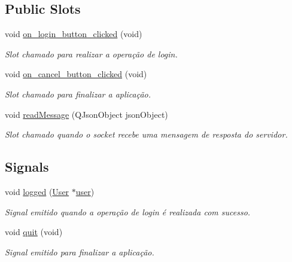 \subsection*{Public Slots}
\begin{DoxyCompactItemize}
\item 
void \hyperlink{classMyLoginDialog_ab850edc55bc360a5271f8da572d9b84b}{on\+\_\+login\+\_\+button\+\_\+clicked} (void)
\begin{DoxyCompactList}\small\item\em Slot chamado para realizar a operação de login. \end{DoxyCompactList}\item 
void \hyperlink{classMyLoginDialog_a98b534e1f3e50217b7d0d603846f6fa3}{on\+\_\+cancel\+\_\+button\+\_\+clicked} (void)
\begin{DoxyCompactList}\small\item\em Slot chamado para finalizar a aplicação. \end{DoxyCompactList}\item 
void \hyperlink{classMyLoginDialog_a6def7158f19720b26ac23274b38ddc2d}{read\+Message} (Q\+Json\+Object json\+Object)
\begin{DoxyCompactList}\small\item\em Slot chamado quando o socket recebe uma mensagem de resposta do servidor. \end{DoxyCompactList}\end{DoxyCompactItemize}
\subsection*{Signals}
\begin{DoxyCompactItemize}
\item 
void \hyperlink{classMyLoginDialog_ab3abd797b7dafbb9b28672d9092c7bec}{logged} (\hyperlink{classUser}{User} $\ast$\hyperlink{classMyLoginDialog_a0827b7a88e7c312902a07cc17b0c9887}{user})
\begin{DoxyCompactList}\small\item\em Signal emitido quando a operação de login é realizada com sucesso. \end{DoxyCompactList}\item 
void \hyperlink{classMyLoginDialog_a81b2fde13842c6557400e0e35b9dd1e0}{quit} (void)\hypertarget{classMyLoginDialog_a81b2fde13842c6557400e0e35b9dd1e0}{}\label{classMyLoginDialog_a81b2fde13842c6557400e0e35b9dd1e0}

\begin{DoxyCompactList}\small\item\em Signal emitido para finalizar a aplicação. \end{DoxyCompactList}\end{DoxyCompactItemize}
